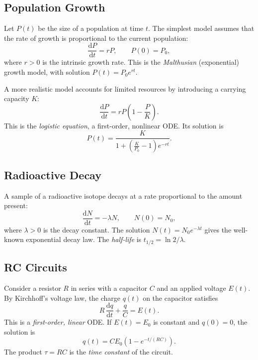 \documentclass[12pt,a4paper,openany]{book}
\theoremstyle{definition}
\theoremstyle{plain}
\theoremstyle{remark}
\newcommand{\dd}{\mathrm{d}}
\begin{document}
\subsection{Population Growth}
\label{subsec:population}

Let $P(t)$ be the size of a population at time $t$. The simplest model assumes that the rate of growth is proportional to the current population:
\begin{equation}\label{eq:malthus}
  \frac{\dd P}{\dd t} = rP, \qquad P(0)=P_0,
\end{equation}
where $r>0$ is the intrinsic growth rate. This is the \emph{Malthusian} (exponential) growth model, with solution $P(t)=P_0 e^{rt}$.

A more realistic model accounts for limited resources by introducing a carrying capacity $K$:
\begin{equation}\label{eq:logistic}
  \frac{\dd P}{\dd t} = rP\!\left(1-\frac{P}{K}\right).
\end{equation}
This is the \emph{logistic equation}, a first-order, nonlinear ODE. Its solution is
\[
  P(t) = \frac{K}{1 + \left(\frac{K}{P_0}-1\right)e^{-rt}}.
\]

\subsection{Radioactive Decay}
\label{subsec:radioactive}

A sample of a radioactive isotope decays at a rate proportional to the amount present:
\begin{equation}\label{eq:decay}
  \frac{\dd N}{\dd t} = -\lambda N, \qquad N(0) = N_0,
\end{equation}
where $\lambda > 0$ is the decay constant. The solution $N(t)=N_0 e^{-\lambda t}$ gives the well-known exponential decay law. The \emph{half-life} is $t_{1/2} = \ln 2 / \lambda$.

\subsection{RC Circuits}
\label{subsec:rc-circuit}

Consider a resistor $R$ in series with a capacitor $C$ and an applied voltage $E(t)$. By Kirchhoff's voltage law, the charge $q(t)$ on the capacitor satisfies
\begin{equation}\label{eq:rc-circuit}
  R\,\frac{\dd q}{\dd t} + \frac{q}{C} = E(t).
\end{equation}
This is a \emph{first-order, linear} ODE. If $E(t)=E_0$ is constant and $q(0)=0$, the solution is
\[
  q(t) = CE_0\!\left(1 - e^{-t/(RC)}\right).
\]
The product $\tau = RC$ is the \emph{time constant} of the circuit.
\end{document}
